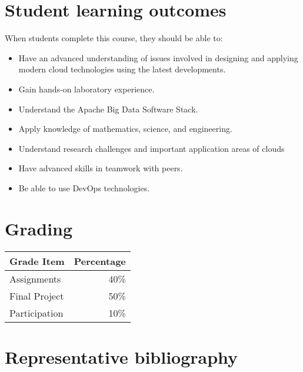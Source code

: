 \section{Student learning outcomes}

When students complete this course, they should be able to:

\begin{itemize}
\item Have an advanced understanding of issues involved in designing
  and applying modern cloud technologies using the latest
  developments.
\item	Gain hands-on laboratory experience.
\item	Understand the Apache Big Data Software Stack.
\item	Apply knowledge of mathematics, science, and engineering.
\item Understand research challenges and important application areas
  of clouds
\item	Have advanced skills in teamwork with peers.
\item Be able to use DevOps technologies.
\end{itemize}

\section{Grading}


\begin{tabular}{lr}
Grade Item	  & Percentage\\
\toprule
Assignments	  & 40\% \\
Final Project	& 50\% \\
Participation	& 10\% \\
\bottomrule
\end{tabular}



\section{Representative bibliography}

